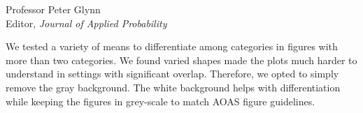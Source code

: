 \documentclass[11pt]{letter} %
\begin{document}
\begin{letter}{Professor
	Peter Glynn\\
	Editor, {\em Journal of Applied Probability}}
\begin{enumerate}
\vspace{5mm}
We tested a variety of means to differentiate among categories in figures with more than two categories.  We found varied shapes made the plots much harder to understand in settings with significant overlap.  Therefore, we opted to simply remove the gray background.  The white background helps with differentiation while keeping the figures in grey-scale to match AOAS figure guidelines.
\vspace{5mm}

\end{enumerate}

\end{letter}
\end{document}
